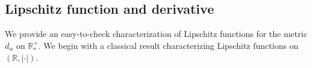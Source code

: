 \documentclass[11pt,a4paper]{article}
\newcommand{\RRP}{\mathbb{R}^+_*}
\begin{document}

\subsection{Lipschitz function and derivative}
We provide an easy-to-check characterization of Lipschitz functions for the metric \( d_\alpha \) on \( \RRP \). We begin with a classical result characterizing Lipschitz functions on \( (\mathbb{R}, |\cdot|) \).
\end{document}
